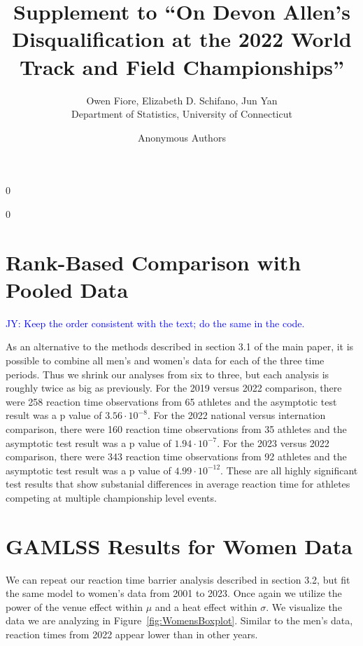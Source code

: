 \documentclass[12pt, letterpaper]{article}
\newcommand{\jy}[1]{\textcolor{blue}{JY: #1}}
\newcommand{\blind}{0}
\begin{document}
\title{\bf Supplement to ``On Devon Allen's Disqualification at the 2022 World Track and Field Championships''}

\blind
{
  \author{Owen Fiore, %
  Elizabeth D. Schifano, %
  Jun Yan\\[1ex]
  Department of Statistics, University of Connecticut\\
}
} \fi

\blind
{
  \bigskip
  \bigskip
  \bigskip
  \author{Anonymous Authors}
  \bigskip
} \fi

\maketitle 

\section{Rank-Based Comparison with Pooled Data}

\jy{Keep the order consistent with the text; do the same in the code.}

As an alternative to the methods described in section 3.1 of the main paper, it
is possible to combine all men's and women's data for each of the three time
periods.  Thus we shrink our analyses from six to three, but each analysis
is roughly twice as big as previously.  For the 2019 versus 2022 comparison,
there were 258 reaction time observations from 65 athletes and the asymptotic
test result was a p value of $3.56 \cdot 10^{-8}$. For the 2022 national versus
internation comparison, there were 160 reaction time observations from 35
athletes and the asymptotic test result was a p value of $1.94 \cdot 10^{-7}$.
For the 2023 versus 2022 comparison, there were 343 reaction time observations
from 92 athletes and the asymptotic test result was a p value of
$4.99 \cdot 10^{-12}$.  These are all highly significant test results that show
substanial differences in average reaction time for athletes competing at
multiple championship level events.


\section{GAMLSS Results for Women Data}

We can repeat our reaction time barrier analysis described in section 3.2, but
fit the same model to women's data from 2001 to 2023.  Once again we utilize
the power of the venue effect within $\mu$ and a heat effect within $\sigma$. 
We visualize the data we are analyzing in Figure~\ref{fig:WomensBoxplot}.
Similar to the men's data, reaction times from 2022 appear lower than in other
years.
\end{document}
